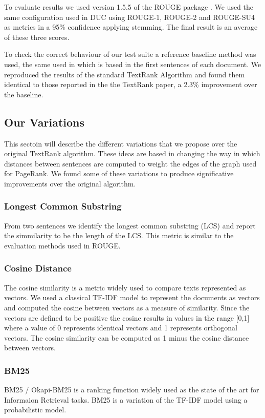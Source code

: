 \documentclass{llncs}
\begin{document}
To evaluate results we used version 1.5.5 of the ROUGE package \cite{Lin2004a}. We used the same configuration used in DUC using ROUGE-1, ROUGE-2 and ROUGE-SU4 as metrics in a 95\% confidence applying stemming. The final result is an average of these three scores.

To check the correct behaviour of our test suite a reference baseline method was used, the same used in \cite{mihalcea-tarau} which is based in the first sentences of each document. We reproduced the results of the standard TextRank Algorithm and found them identical to those reported in the the TextRank paper, a 2.3\% improvement over the baseline.


\subsection{Our Variations}
This sectoin will describe the different variations that we propose over the original TextRank algorithm. These ideas are based in changing the way in which distances between sentences are computed to weight the edges of the graph used for PageRank. We found some of these variations to produce significative improvements over the original algorithm.

\subsubsection{Longest Common Substring}
From two sentences we identify the longest common substring (LCS) and report the simmilarity to be the length of the LCS. This metric is similar to the evaluation methods used in ROUGE.

\subsubsection{Cosine Distance}
The cosine similarity is a metric widely used to compare texts represented as vectors. We used a classical TF-IDF model to represent the documents as vectors and computed the cosine between vectors as a measure of similarity. Since the vectors are defined to be positive the cosine results in values in the range [0,1] where a value of 0 represents identical vectors and 1 represents orthogonal vectors. The cosine similarity can be computed as 1 minus the cosine distance between vectors. 

\subsubsection{BM25}
BM25 / Okapi-BM25 is a ranking function widely used as the state of the art for Informaion Retrieval tasks. BM25 is a variation of the TF-IDF model using a probabilistic model.
\end{document}

